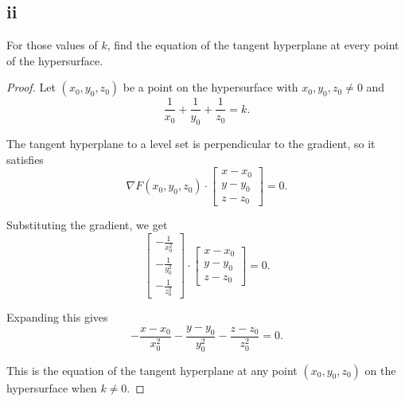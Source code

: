 \documentclass{article}
\begin{document}
\subsection*{ii}
For those values of $k$, find the equation of the tangent hyperplane at every point of the hypersurface.

\begin{proof}
    Let $(x_0,y_0,z_0)$ be a point on the hypersurface with $x_0,y_0,z_0\neq 0$ and
    $$\frac{1}{x_0}+\frac{1}{y_0}+\frac{1}{z_0}=k.$$

    The tangent hyperplane to a level set is perpendicular to the gradient, so it satisfies
    $$\nabla F(x_0,y_0,z_0)\cdot 
    \begin{bmatrix}
        x-x_0 \\
        y-y_0 \\
        z-z_0
    \end{bmatrix}
    =0.$$

    Substituting the gradient, we get
    $$
    \begin{bmatrix}
        -\frac{1}{x_0^2} \\
        -\frac{1}{y_0^2} \\
        -\frac{1}{z_0^2}
    \end{bmatrix}
    \cdot
    \begin{bmatrix}
        x-x_0 \\
        y-y_0 \\
        z-z_0
    \end{bmatrix}
    =0.
    $$

    Expanding this gives
    $$
    -\frac{x-x_0}{x_0^2}
    -\frac{y-y_0}{y_0^2}
    -\frac{z-z_0}{z_0^2}
    =0.
    $$

    This is the equation of the tangent hyperplane at any point $(x_0,y_0,z_0)$ on the hypersurface when $k\neq 0$.
\end{proof}
\end{document}
